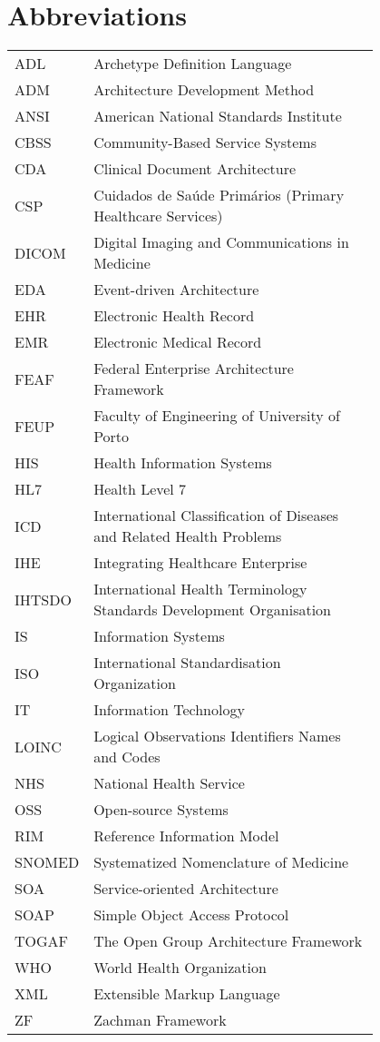 \chapter*{Abbreviations}

\begin{flushleft}
\begin{tabular}{l p{0.8\linewidth}}
ADL		& Archetype Definition Language \\
ADM		& Architecture Development Method \\
ANSI	& American National Standards Institute \\
CBSS	& Community-Based Service Systems \\
CDA		& Clinical Document Architecture \\
CSP		& Cuidados de Saúde Primários (Primary Healthcare Services) \\
DICOM	& Digital Imaging and Communications in Medicine \\
EDA		& Event-driven Architecture \\
EHR		& Electronic Health Record \\
EMR		& Electronic Medical Record \\
FEAF	& Federal Enterprise Architecture Framework \\
FEUP	& Faculty of Engineering of University of Porto \\
HIS		& Health Information Systems \\
HL7		& Health Level 7 \\
ICD		& International Classification of Diseases and Related Health Problems \\
IHE		& Integrating Healthcare Enterprise \\
IHTSDO  & International Health Terminology Standards Development Organisation \\
IS		& Information Systems \\
ISO		& International Standardisation Organization \\
IT		& Information Technology \\
LOINC   & Logical Observations Identifiers Names and Codes \\
NHS		& National Health Service \\
OSS		& Open-source Systems \\
RIM		& Reference Information Model \\
SNOMED	& Systematized Nomenclature of Medicine \\
SOA		& Service-oriented Architecture \\
SOAP	& Simple Object Access Protocol \\
TOGAF   & The Open Group Architecture Framework \\
WHO		& World Health Organization \\
XML	    & Extensible Markup Language \\
ZF		& Zachman Framework 
\end{tabular}
\end{flushleft}

